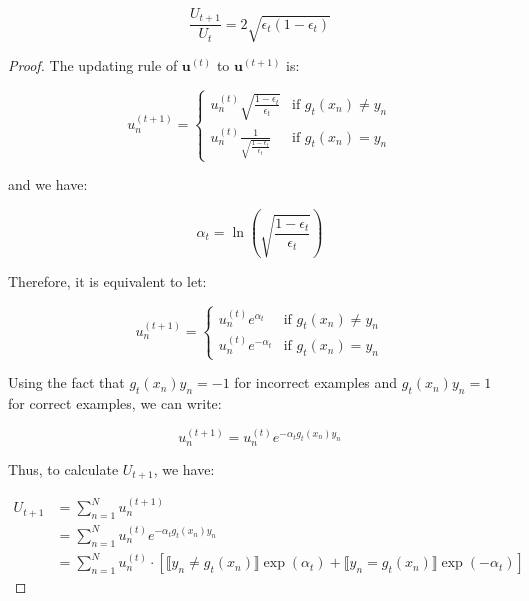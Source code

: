 \documentclass{article}
\begin{document}
\begin{equation*}
    \frac{U_{t+1}}{U_t} = 2\sqrt{\epsilon_t(1-\epsilon_t)}
\end{equation*}

\begin{proof}

The updating rule of $\mathbf{u}^{(t)}$ to $\mathbf{u}^{(t+1)}$ is:

\begin{equation*}
    u_n^{(t+1)} = 
    \begin{cases}
        u_n^{(t)} \sqrt{\frac{1-\epsilon_t}{\epsilon_t}} & \text{if } g_t(x_n) \neq y_n \\
        u_n^{(t)}  \frac{1}{\sqrt{\frac{1-\epsilon_t}{\epsilon_t}}} & \text{if } g_t(x_n) = y_n 
    \end{cases}
\end{equation*}

and we have:

\begin{equation*}
\alpha_t = \ln \left( \sqrt{\frac{1-\epsilon_t}{\epsilon_t}} \right)
\end{equation*}

Therefore, it is equivalent to let:

\begin{equation*}
    u_n^{(t+1)} = 
    \begin{cases}
        u_n^{(t)} e^{\alpha_t} & \text{if } g_t(x_n) \neq y_n \\
        u_n^{(t)} e^{-\alpha_t} & \text{if } g_t(x_n) = y_n 
    \end{cases}
\end{equation*}

Using the fact that $ g_t(x_n)y_n = -1$ for incorrect examples and $ g_t(x_n)y_n = 1$ for correct examples, we can write:

\begin{equation*}
    u_n^{(t+1)} = u_n^{(t)}e^{-\alpha_t g_t(x_n) y_n}
\end{equation*}

Thus, to calculate $U_{t+1}$, we have:

\begin{equation*}
\begin{split}
    U_{t+1} 
    &= \sum_{n=1}^N u_n^{(t+1)} \\
    &= \sum_{n=1}^N u_n^{(t)} e^{-\alpha_t g_t(x_n) y_n} \\
    &= \sum_{n=1}^N u_n^{(t)} \cdot \left[\llbracket y_n \neq g_t(x_n) \rrbracket \exp(\alpha_t) + \llbracket y_n = g_t(x_n) \rrbracket \exp(-\alpha_t)\right]
\end{split}
\end{equation*}


\end{proof}
\end{document}
